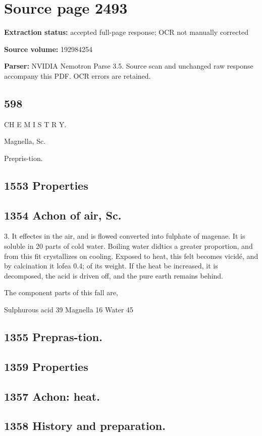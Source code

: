 \clearpage
\section{Source page 2493}
\textbf{Extraction status:} accepted full-page response; OCR not manually corrected\par
\textbf{Source volume:} 192984254\par
\textbf{Parser:} NVIDIA Nemotron Parse 3.5. Source scan and unchanged raw response accompany this PDF. OCR errors are retained.\par\medskip
\subsection*{598}
CH E M I S T R Y.\par\medskip
Magnella,
Sc.\par{}
Prepris-tion.\par\medskip
\subsection*{1553
Properties}
\subsection*{1354
Achon of
air, Sc.}
3. It effectes in the air, and is flowed converted into fulphate of magenae. It is soluble in 20 parts of cold water. Boiling water didtics a greater proportion, and from this fit crystallizes on cooling. Exposed to heat, this felt becomes vicidé, and by calcination it lofea 0.4; of its weight. If the heat be increased, it is decomposed, the acid is driven off, and the pure earth remains behind.\par\medskip
The component parts of this fall are,\par\medskip
Sulphurous acid 39
Magnella 16
Water 45\par\medskip
\subsection*{1355
Prepras-tion.}
\subsection*{1359
Properties}
\subsection*{1357
Achon:
heat.}
\subsection*{1358
History and preparation.}
